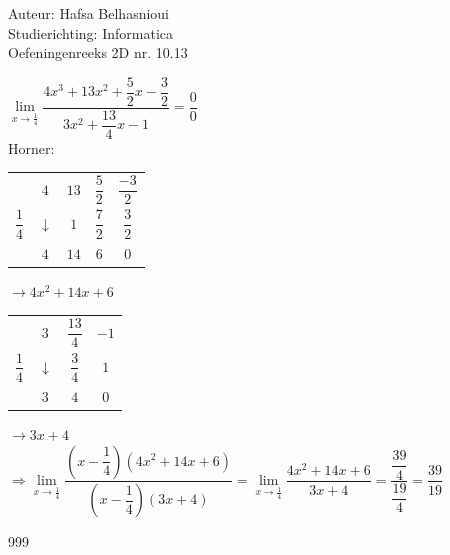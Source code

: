 \documentclass[a4paper]{article}
\begin{document}
\noindent \large Auteur: Hafsa Belhasnioui \\
\noindent \large Studierichting: Informatica\\
\noindent \large Oefeningenreeks 2D nr. 10.13\\

\medskip

\normalsize

$\lim\limits_{x \rightarrow \tfrac{1}{4}} \dfrac{4x^3 + 13x^2 + \dfrac{5}{2}x - \dfrac{3}{2}}{3x^2 + \dfrac{13}{4}x - 1} = \dfrac{0}{0}$ \\

Horner: \\


\begin{tabular}{c|cccc}
				& $4$			& $13$	& $\dfrac{5}{2}$		& $\dfrac{-3}{2}$\\
$\dfrac{1}{4}$	& $\downarrow$	& $1$	& $\dfrac{7}{2}$		& $\dfrac{3}{2}$ \\ \hline
				& $4$			& $14$ 	& $6$ 				& $0$			 \\
\end{tabular}

$\rightarrow 4x^2 + 14x + 6$ \\


\begin{tabular}{c|ccc}
				& $3$			& $\dfrac{13}{4}$	& $-1$	\\
$\dfrac{1}{4}$	& $\downarrow$	& $\dfrac{3}{4}$		& $1$	\\ \hline
				& $3$			& $4$ 				& $0$	\\
\end{tabular}

$\rightarrow 3x + 4$ \\

$\Rightarrow \lim\limits_{x \rightarrow \tfrac{1}{4}} \dfrac{\left(x-\dfrac{1}{4}\right) (4x^2 + 14x + 6)}{\left(x-\dfrac{1}{4}\right)(3x + 4)} = \lim\limits_{x \rightarrow \tfrac{1}{4}} \dfrac{4x^2 + 14x + 6}{3x + 4} = \dfrac{\dfrac{39}{4}}{\dfrac{19}{4}} = \dfrac{39}{19}$ \\


\begin{thebibliography}{999}
\end{thebibliography}
\end{document}
